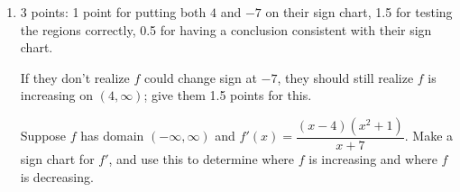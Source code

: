 \documentclass{article}
\begin{document}
\begin{enumerate}
\begin{enumerate}
  \item
    \begin{problem}[\vfill\newpage]
      Sketch an example of a function $f$ that's differentiable at $x = 3$ but not continuous at $x = 3$, or say that it's impossible. 
    \end{problem}

    \begin{solution}
      This is impossible.
    \end{solution}

  \item
    \begin{problem}[\vfill]
      Sketch an example of a function $f$ that's both continuous at $x = 3$ and differentiable at $x = 3$, or say that it's impossible. 
    \end{problem}

    \begin{solution}
    
    \end{solution}

  \end{enumerate}

\item  \begin{grading}
    3 points: 1 point for putting both $4$ and $-7$ on their sign chart, 1.5 for testing the regions correctly, 0.5 for having a conclusion consistent with their sign chart.

    If they don't realize $f$ could change sign at $-7$, they should still realize $f$ is increasing on $(4, \infty)$; give them 1.5 points for this. 
  \end{grading}

  \begin{problem}[\nstretch{2}]
    Suppose $f$ has domain $(-\infty, \infty)$ and $f'(x) = \dfrac{(x - 4)(x^2 + 1)}{x + 7}$. Make a sign chart for $f'$, and use this to determine where $f$ is increasing and where $f$ is decreasing.
  \end{problem}


\end{enumerate}
\end{document}
